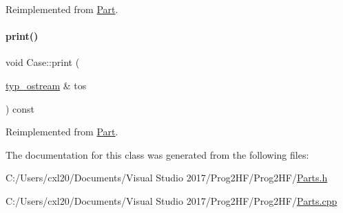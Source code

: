 Reimplemented from \mbox{\hyperlink{class_part_aa602d876151b63db72cf8f666847a8cd}{Part}}.

\mbox{\label{class_case_a6cce910485e45c0b30018fce491c154f}} 
\paragraph{\texorpdfstring{print()}{print()}\hspace{0.1cm}{\footnotesize\ttfamily [4/4]}}
{\footnotesize\ttfamily void Case\+::print (\begin{DoxyParamCaption}\item[{\mbox{\hyperlink{structtyp__ostream}{typ\+\_\+ostream}} \&}]{tos }\end{DoxyParamCaption}) const\hspace{0.3cm}{\ttfamily [virtual]}}



Reimplemented from \mbox{\hyperlink{class_part_ab6396030e8b7a724731a8b54bd4942fc}{Part}}.



The documentation for this class was generated from the following files\+:\begin{DoxyCompactItemize}
\item 
C\+:/\+Users/cxl20/\+Documents/\+Visual Studio 2017/\+Prog2\+H\+F/\+Prog2\+H\+F/\mbox{\hyperlink{_parts_8h}{Parts.\+h}}\item 
C\+:/\+Users/cxl20/\+Documents/\+Visual Studio 2017/\+Prog2\+H\+F/\+Prog2\+H\+F/\mbox{\hyperlink{_parts_8cpp}{Parts.\+cpp}}\end{DoxyCompactItemize}
